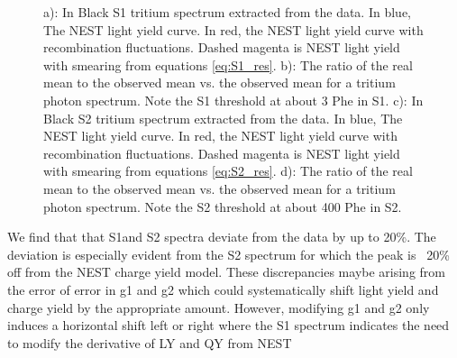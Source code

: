 \begin{figure}[h!]
\caption{ a): In Black S1 tritium spectrum extracted from the data. In blue, The NEST light yield curve. In red, the NEST light yield curve with recombination fluctuations. Dashed magenta is NEST light yield with smearing from equations \ref{eq:S1_res}.  b): The ratio of the real mean to the observed mean vs. the observed mean for a tritium photon spectrum. Note the S1 threshold at about 3 Phe in S1. c): In Black S2 tritium spectrum extracted from the data. In blue, The NEST light yield curve. In red, the NEST light yield curve with recombination fluctuations. Dashed magenta is NEST light yield with smearing from equations \ref{eq:S2_res}.  d): The ratio of the real mean to the observed mean vs. the observed mean for a tritium photon spectrum. Note the S2 threshold at about 400 Phe in S2. }

\label{fig:S1S2_mapping}
\end{figure}
\renewcommand{\baselinestretch}{2}
\small\normalsize


We find that that S1and S2 spectra deviate from the data by up to 20\%. The deviation is especially evident from the S2 spectrum for which the peak is ~20\% off from the NEST charge yield model. These discrepancies maybe arising from the error of error in g1 and g2 which could systematically shift light yield and charge yield by the appropriate amount. However, modifying g1 and g2 only induces a horizontal shift left or right where the S1 spectrum indicates the need to modify the derivative of LY and QY from NEST



